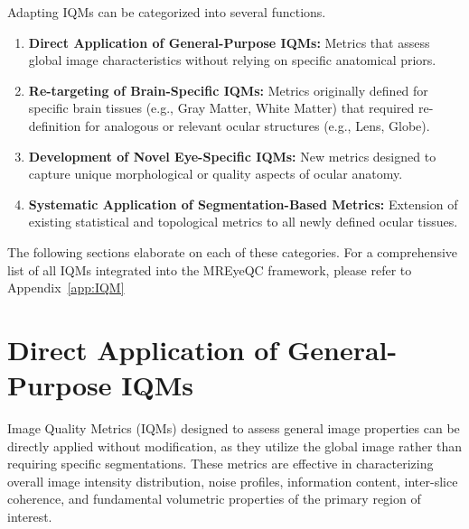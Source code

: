 Adapting IQMs can be categorized into several functions.

\begin{enumerate}
    \item \textbf{Direct Application of General-Purpose IQMs:} Metrics that assess global image characteristics without relying on specific anatomical priors.
    \item \textbf{Re-targeting of Brain-Specific IQMs:} Metrics originally defined for specific brain tissues (e.g., Gray Matter, White Matter) that required re-definition for analogous or relevant ocular structures (e.g., Lens, Globe).
    \item \textbf{Development of Novel Eye-Specific IQMs:} New metrics designed to capture unique morphological or quality aspects of ocular anatomy.
    \item \textbf{Systematic Application of Segmentation-Based Metrics:} Extension of existing statistical and topological metrics to all newly defined ocular tissues.
\end{enumerate}
The following sections elaborate on each of these categories. For a comprehensive list of all IQMs integrated into the MREyeQC framework, please refer to Appendix~\ref{app:IQM} 

\section{Direct Application of General-Purpose IQMs}
\label{sec:general_purpose_iqms}

Image Quality Metrics (IQMs) designed to assess general image properties can be directly applied without modification, as they utilize the global image rather than requiring specific segmentations. These metrics are effective in characterizing overall image intensity distribution, noise profiles, information content, inter-slice coherence, and fundamental volumetric properties of the primary region of interest.

